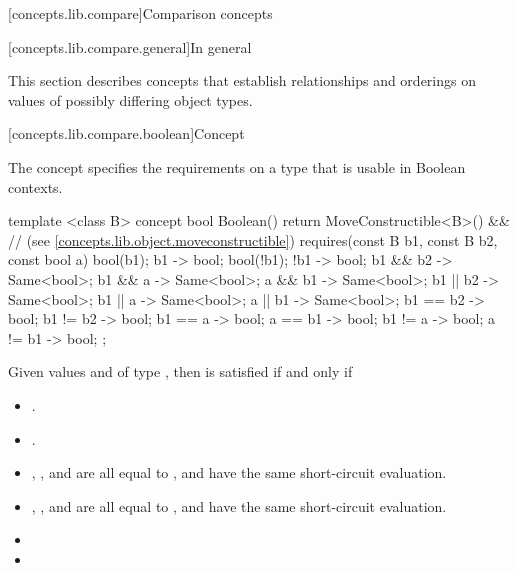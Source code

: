 [concepts.lib.compare]{Comparison concepts}

[concepts.lib.compare.general]{In general}

\pnum
This section describes concepts that establish relationships and orderings
on values of possibly differing object types.

[concepts.lib.compare.boolean]{Concept }

\pnum
The  concept specifies the requirements on a type that is usable in Boolean contexts.

%
\begin{itemdecl}
template <class B>
concept bool Boolean() {
  return MoveConstructible<B>() && // (see \ref{concepts.lib.object.moveconstructible})
    requires(const B b1, const B b2, const bool a) {
      bool(b1);
      { b1 } -> bool;
      bool(!b1);
      { !b1 } -> bool;
      { b1 && b2 } -> Same<bool>;
      { b1 && a } -> Same<bool>;
      { a && b1 } -> Same<bool>;
      { b1 || b2 } -> Same<bool>;
      { b1 || a } -> Same<bool>;
      { a || b1 } -> Same<bool>;
      { b1 == b2 } -> bool;
      { b1 != b2 } -> bool;
      { b1 == a } -> bool;
      { a == b1 } -> bool;
      { b1 != a } -> bool;
      { a != b1 } -> bool;
    };
}
\end{itemdecl}

\pnum
Given values  and  of type , then
 is satisfied if and only if

\begin{itemize}
\item {}.
\item {}.
\item {}, , and
       are all equal to
      , and have the same short-circuit evaluation.
\item {}, , and
       are all equal to
      , and have the same short-circuit evaluation.
\item {}
\item {}
\end{itemize}

